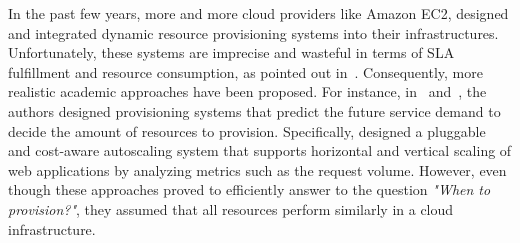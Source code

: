 


In the past few years, more and more cloud providers like Amazon EC2, designed and integrated dynamic resource provisioning systems into their infrastructures. Unfortunately, these systems are imprecise and wasteful in terms of SLA fulfillment and resource consumption, as pointed out in~\cite{ghanbari_exploring_2011}. Consequently, more realistic academic approaches have been proposed. For instance, in~\cite{ali-eldin_2012} and~\cite{bunch_2012}, the authors designed provisioning systems that predict the future service demand to decide the amount of resources to provision. Specifically, \cite{bunch_2012} designed a pluggable and cost-aware autoscaling system that supports horizontal and vertical scaling of web applications by analyzing metrics such as the request volume. However, even though these approaches proved to efficiently answer to the question \emph{"When to provision?"}, they assumed that all resources perform similarly in a cloud infrastructure.

